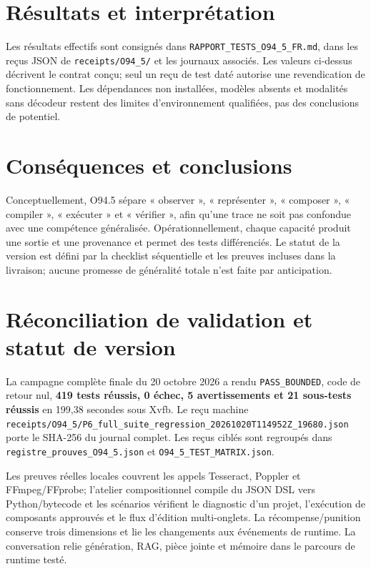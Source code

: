 \documentclass[11pt,a4paper]{article}
\begin{document}
\section{Résultats et interprétation}
Les résultats effectifs sont consignés dans \texttt{RAPPORT\_TESTS\_O94\_5\_FR.md}, dans les reçus JSON de \texttt{receipts/O94\_5/} et les journaux associés. Les valeurs ci-dessus décrivent le contrat conçu; seul un reçu de test daté autorise une revendication de fonctionnement. Les dépendances non installées, modèles absents et modalités sans décodeur restent des limites d'environnement qualifiées, pas des conclusions de potentiel.

\section{Conséquences et conclusions}
Conceptuellement, O94.5 sépare « observer », « représenter », « composer », « compiler », « exécuter » et « vérifier », afin qu'une trace ne soit pas confondue avec une compétence généralisée. Opérationnellement, chaque capacité produit une sortie et une provenance et permet des tests différenciés. Le statut de la version est défini par la checklist séquentielle et les preuves incluses dans la livraison; aucune promesse de généralité totale n'est faite par anticipation.


\section{Réconciliation de validation et statut de version}
La campagne complète finale du 20 octobre 2026 a rendu \texttt{PASS\_BOUNDED}, code de retour nul, \textbf{419 tests réussis, 0 échec, 5 avertissements et 21 sous-tests réussis} en 199,38 secondes sous Xvfb. Le reçu machine \texttt{receipts/O94\_5/P6\_full\_suite\_regression\_20261020T114952Z\_19680.json} porte le SHA-256 du journal complet. Les reçus ciblés sont regroupés dans \texttt{registre\_prouves\_O94\_5.json} et \texttt{O94\_5\_TEST\_MATRIX.json}.

Les preuves réelles locales couvrent les appels Tesseract, Poppler et FFmpeg/FFprobe; l'atelier compositionnel compile du JSON DSL vers Python/bytecode et les scénarios vérifient le diagnostic d’un projet, l’exécution de composants approuvés et le flux d'édition multi-onglets. La récompense/punition conserve trois dimensions et lie les changements aux événements de runtime. La conversation relie génération, RAG, pièce jointe et mémoire dans le parcours de runtime testé.
\end{document}
